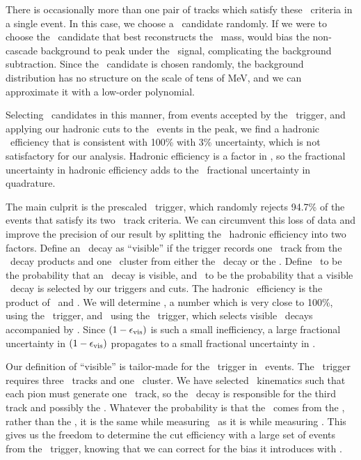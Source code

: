 \documentclass{cornell}
\begin{document}
There is occasionally more than one pair of tracks which satisfy these
\pipi\ criteria in a single event.  In this case, we choose a \pipi\
candidate randomly.  If we were to choose the \pipi\ candidate that
best reconstructs the \us\ mass, would bias the non-cascade
background to peak under the \twotoone\ signal, complicating the
background subtraction.  Since the \pipi\ candidate is chosen
randomly, the background distribution has no structure on the scale of
tens of MeV, and we can approximate it with a low-order polynomial.

Selecting \twotoone\ candidates in this manner, from events accepted
by the \twotrack\ trigger, and applying our hadronic cuts to the \us\
events in the peak, we find a hadronic \us\ efficiency that is
consistent with 100\% with 3\% uncertainty, which is not satisfactory
for our analysis.  Hadronic efficiency is a factor in \geehadtot, so
the fractional uncertainty in hadronic efficiency adds to the
\geehadtot\ fractional uncertainty in quadrature.

The main culprit is the prescaled \twotrack\ trigger, which randomly
rejects 94.7\% of the events that satisfy its two \axial\ track
criteria.  We can circumvent this loss of data and improve the
precision of our result by splitting the \us\ hadronic efficiency into
two factors.  Define an \us\ decay as ``visible'' if the trigger
records one \axial\ track from the \us\ decay products and one \cblo\
cluster from either the \us\ decay or the \pipi.  Define \evis\ to be
the probability that an \us\ decay is visible, and \ecuts\ to be the
probability that a visible \us\ decay is selected by our triggers and
cuts.  The hadronic \us\ efficiency is the product of \evis\ and
\ecuts.  We will determine \evis, a number which is very close to
100\%, using the \twotrack\ trigger, and \ecuts\ using the \hadron\
trigger, which selects visible \us\ decays accompanied by \pipi.
Since $(1-\epsilon_{\mbox{\scriptsize vis}})$ is such a small inefficiency, a large
fractional uncertainty in $(1-\epsilon_{\mbox{\scriptsize vis}})$ propagates to a
small fractional uncertainty in \evis.

Our definition of ``visible'' is tailor-made for the \hadron\ trigger
in \twotoone\ events.  The \hadron\ trigger requires three \axial\
tracks and one \cblo\ cluster.  We have selected \pipi\ kinematics
such that each pion must generate one \axial\ track, so the \us\ decay
is responsible for the third track and possibly the \cblo.  Whatever
the probability is that the \cblo\ comes from the \pipi, rather than
the \us, it is the same while measuring \evis\ as it is while
measuring \ecuts.  This gives us the freedom to determine the cut
efficiency with a large set of events from the \hadron\ trigger,
knowing that we can correct for the bias it introduces with \evis.
\end{document}
